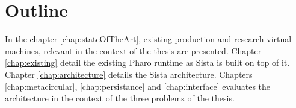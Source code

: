 \documentclass[a4paper,12pt,twoside]{../includes/ThesisStyle}
\begin{document}
\section{Outline}

In the chapter \ref{chap:stateOfTheArt}, existing production and research virtual machines, relevant in the context of the thesis are presented. Chapter \ref{chap:existing} detail the existing Pharo runtime as Sista is built on top of it. Chapter \ref{chap:architecture} details the Sista architecture. Chapters \ref{chap:metacircular}, \ref{chap:persistance} and \ref{chap:interface} evaluates the architecture in the context of the three problems of the thesis.






\ifx\wholebook\relax\else
    
\end{document}

